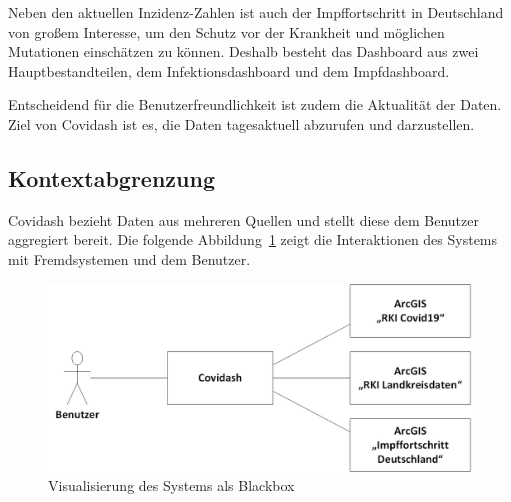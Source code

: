 \documentclass[conference]{IEEEtran}
\begin{document}
Neben den aktuellen Inzidenz-Zahlen ist auch der Impffortschritt in Deutschland von großem Interesse, um den Schutz vor der Krankheit und möglichen Mutationen einschätzen zu können. Deshalb besteht das Dashboard aus zwei Hauptbestandteilen, dem Infektionsdashboard und dem Impfdashboard.

Entscheidend für die Benutzerfreundlichkeit ist zudem die Aktualität der Daten. Ziel von Covidash ist es, die Daten tagesaktuell abzurufen und darzustellen.



\subsection{Kontextabgrenzung}

Covidash bezieht Daten aus mehreren Quellen und stellt diese dem Benutzer aggregiert bereit.
Die folgende Abbildung~\ref{abb:blackbox} zeigt die Interaktionen des Systems mit Fremdsystemen und dem Benutzer.
\begin{figure}[htb]%
    \centering%
    \includegraphics[width=0.76\columnwidth]{img/Kontextabgrenzung.png}%
    \caption{Visualisierung des Systems als Blackbox}%
    \label{abb:blackbox}%
\end{figure}

\vfill\eject
\end{document}
